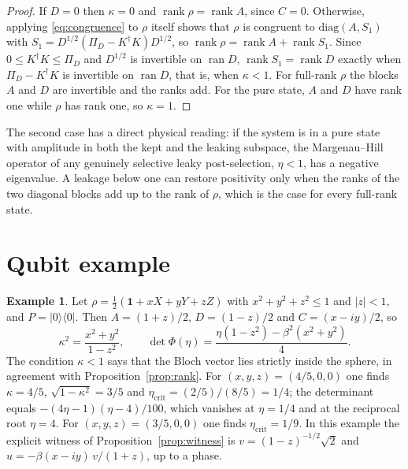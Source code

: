 \documentclass[11pt,a4paper]{article}
\theoremstyle{definition}
\newtheorem{example}[theorem]{Example}
\theoremstyle{plain}
\DeclareMathOperator{\ran}{ran}
\DeclareMathOperator{\rank}{rank}
\newcommand{\ket}[1]{\lvert#1\rangle}
\newcommand{\bra}[1]{\langle#1\rvert}
\newcommand{\one}{\mathbf{1}}
\newcommand{\etac}{\eta_{\mathrm{crit}}}
\begin{document}
\begin{proof}
If $D=0$ then $\kappa=0$ and $\rank\rho=\rank A$, since $C=0$. Otherwise,
applying \eqref{eq:congruence} to $\rho$ itself shows that $\rho$ is congruent
to $\mathrm{diag}(A,S_1)$ with $S_1=D^{1/2}(\Pi_D-K^\dagger K)D^{1/2}$, so
$\rank\rho=\rank A+\rank S_1$. Since $0\le K^\dagger K\le\Pi_D$ and $D^{1/2}$ is
invertible on $\ran D$, $\rank S_1=\rank D$ exactly when $\Pi_D-K^\dagger K$ is
invertible on $\ran D$, that is, when $\kappa<1$. For full-rank $\rho$ the
blocks $A$ and $D$ are invertible and the ranks add. For the pure state, $A$
and $D$ have rank one while $\rho$ has rank one, so $\kappa=1$.
\end{proof}

The second case has a direct physical reading: if the system is in a pure
state with amplitude in both the kept and the leaking subspace, the
Margenau--Hill operator of any genuinely selective leaky post-selection,
$\eta<1$, has a negative eigenvalue. A leakage below one can restore
positivity only when the ranks of the two diagonal blocks add up to the rank
of $\rho$, which is the case for every full-rank state.

\section{Qubit example}\label{sec:qubit}
\begin{example}\label{ex:qubit}
Let $\rho=\tfrac12(\one+xX+yY+zZ)$ with $x^2+y^2+z^2\le1$ and $\lvert z\rvert<1$,
and $P=\ket0\bra0$. Then $A=(1+z)/2$, $D=(1-z)/2$ and $C=(x-iy)/2$, so
\[
\kappa^2=\frac{x^2+y^2}{1-z^2},\qquad
\det\Phi(\eta)=\frac{\eta(1-z^2)-\beta^2(x^2+y^2)}{4}.
\]
The condition $\kappa<1$ says that the Bloch vector lies strictly inside the
sphere, in agreement with Proposition~\ref{prop:rank}. For $(x,y,z)=(4/5,0,0)$
one finds $\kappa=4/5$, $\sqrt{1-\kappa^2}=3/5$ and $\etac=(2/5)/(8/5)=1/4$; the
determinant equals $-(4\eta-1)(\eta-4)/100$, which vanishes at $\eta=1/4$ and at
the reciprocal root $\eta=4$. For $(x,y,z)=(3/5,0,0)$ one finds $\etac=1/9$.
In this example the explicit witness of Proposition~\ref{prop:witness} is
$v=(1-z)^{-1/2}\sqrt2$ and $u=-\beta(x-iy)\,v/(1+z)$, up to a phase.
\end{example}
\end{document}
